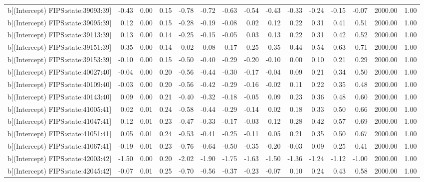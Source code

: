 \begin{table}[ht]
\begin{tabular}{rrrrrrrrrrrrrrr}
  b[(Intercept) FIPS:state:39093:39] & -0.43 & 0.00 & 0.15 & -0.78 & -0.72 & -0.63 & -0.54 & -0.43 & -0.33 & -0.24 & -0.15 & -0.07 & 2000.00 & 1.00 \\ 
  b[(Intercept) FIPS:state:39095:39] & 0.12 & 0.00 & 0.15 & -0.28 & -0.19 & -0.08 & 0.02 & 0.12 & 0.22 & 0.31 & 0.41 & 0.51 & 2000.00 & 1.00 \\ 
  b[(Intercept) FIPS:state:39113:39] & 0.13 & 0.00 & 0.14 & -0.25 & -0.15 & -0.05 & 0.03 & 0.13 & 0.22 & 0.31 & 0.42 & 0.52 & 2000.00 & 1.00 \\ 
  b[(Intercept) FIPS:state:39151:39] & 0.35 & 0.00 & 0.14 & -0.02 & 0.08 & 0.17 & 0.25 & 0.35 & 0.44 & 0.54 & 0.63 & 0.71 & 2000.00 & 1.00 \\ 
  b[(Intercept) FIPS:state:39153:39] & -0.10 & 0.00 & 0.15 & -0.50 & -0.40 & -0.29 & -0.20 & -0.10 & 0.00 & 0.10 & 0.21 & 0.29 & 2000.00 & 1.00 \\ 
  b[(Intercept) FIPS:state:40027:40] & -0.04 & 0.00 & 0.20 & -0.56 & -0.44 & -0.30 & -0.17 & -0.04 & 0.09 & 0.21 & 0.34 & 0.50 & 2000.00 & 1.00 \\ 
  b[(Intercept) FIPS:state:40109:40] & -0.03 & 0.00 & 0.20 & -0.56 & -0.42 & -0.29 & -0.16 & -0.02 & 0.11 & 0.22 & 0.35 & 0.48 & 2000.00 & 1.00 \\ 
  b[(Intercept) FIPS:state:40143:40] & 0.09 & 0.00 & 0.21 & -0.40 & -0.32 & -0.18 & -0.05 & 0.09 & 0.23 & 0.36 & 0.48 & 0.60 & 2000.00 & 1.00 \\ 
  b[(Intercept) FIPS:state:41005:41] & 0.02 & 0.01 & 0.24 & -0.58 & -0.44 & -0.29 & -0.14 & 0.02 & 0.18 & 0.33 & 0.50 & 0.66 & 2000.00 & 1.00 \\ 
  b[(Intercept) FIPS:state:41047:41] & 0.12 & 0.01 & 0.23 & -0.47 & -0.33 & -0.17 & -0.03 & 0.12 & 0.28 & 0.42 & 0.57 & 0.69 & 2000.00 & 1.00 \\ 
  b[(Intercept) FIPS:state:41051:41] & 0.05 & 0.01 & 0.24 & -0.53 & -0.41 & -0.25 & -0.11 & 0.05 & 0.21 & 0.35 & 0.50 & 0.67 & 2000.00 & 1.00 \\ 
  b[(Intercept) FIPS:state:41067:41] & -0.19 & 0.01 & 0.23 & -0.76 & -0.64 & -0.50 & -0.35 & -0.20 & -0.03 & 0.09 & 0.25 & 0.41 & 2000.00 & 1.00 \\ 
  b[(Intercept) FIPS:state:42003:42] & -1.50 & 0.00 & 0.20 & -2.02 & -1.90 & -1.75 & -1.63 & -1.50 & -1.36 & -1.24 & -1.12 & -1.00 & 2000.00 & 1.00 \\ 
  b[(Intercept) FIPS:state:42045:42] & -0.07 & 0.01 & 0.25 & -0.70 & -0.56 & -0.37 & -0.23 & -0.07 & 0.10 & 0.24 & 0.43 & 0.58 & 2000.00 & 1.00 \\ 

\end{tabular}
\end{table}

